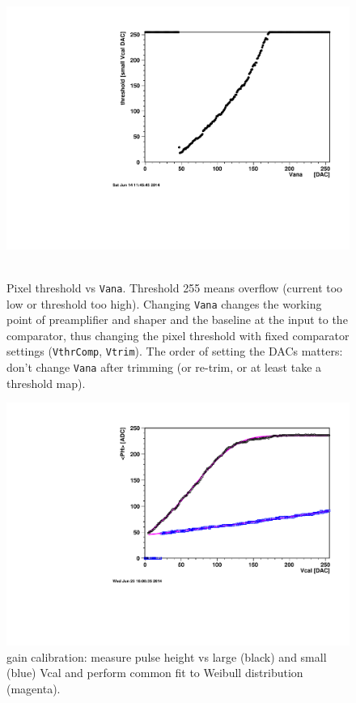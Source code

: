 \documentclass[english]{article}
\begin{document}
%
\begin{figure}
\hfill{}\includegraphics[scale=0.5]{c405-thr-vs-ia}\hfill{}~\protect\caption{Pixel threshold vs \texttt{Vana}. Threshold 255 means overflow (current
too low or threshold too high). Changing \texttt{Vana} changes the
working point of preamplifier and shaper and the baseline at the input
to the comparator, thus changing the pixel threshold with fixed comparator
settings (\texttt{VthrComp}, \texttt{Vtrim}). The order of setting
the DACs matters: don't change \texttt{Vana} after trimming (or re-trim,
or at least take a threshold map).}
%
\end{figure}


%
\begin{figure}
\includegraphics[scale=0.5]{PH-vs-Vcal-fit2}\caption{gain calibration: measure pulse height vs large (black) and small
(blue) Vcal and perform common fit to Weibull distribution (magenta).}
%
\end{figure}
\end{document}
